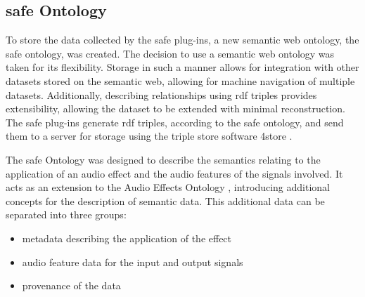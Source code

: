 	\subsection{\acrshort{safe} Ontology}
	\label{sec:TimbreEvaluation-DAWBasedTimbreEvaluation-SAFEOntology}
		To store the data collected by the \acrshort{safe} plug-ins, a new semantic web ontology, the
		\acrshort{safe} ontology, was created. The decision to use a semantic web ontology was taken for its
		flexibility. Storage in such a manner allows for integration with other datasets stored on the semantic
		web, allowing for machine navigation of multiple datasets. Additionally, describing relationships using
		\acrfull{rdf} triples provides extensibility, allowing the dataset to be extended with minimal
		reconstruction. The \acrshort{safe} plug-ins generate \acrshort{rdf} triples, according to the
		\acrshort{safe} ontology, and send them to a server for storage using the triple store software 4store
		\citep{harris20094store}.
		
		The \acrshort{safe} Ontology was designed to describe the semantics relating to the application of an
		audio effect and the audio features of the signals involved. It acts as an extension to the Audio Effects
		Ontology \citep{wilmering2013the}, introducing additional concepts for the description of semantic data.
		This additional data can be separated into three groups:

		\begin{itemize}
			\item metadata describing the application of the effect
			\item audio feature data for the input and output signals
			\item provenance of the data
		\end{itemize}

